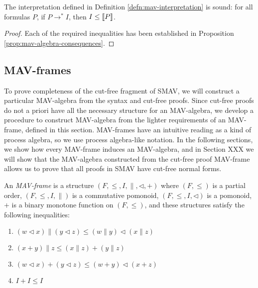 \begin{theorem}\label{thm:soundness}
  The interpretation defined in Definition
  \ref{defn:mav-interpretation} is sound: for all formulas $P$, if
  $P \longrightarrow^* I$, then $I \leq \llbracket P \rrbracket$.
\end{theorem}

\begin{proof}
  Each of the required inequalities has been established in
  Proposition \ref{prop:mav-algebra-consequences}.
\end{proof}

\subsection{MAV-frames}

To prove completeness of the cut-free fragment of SMAV, we will
construct a particular MAV-algebra from the syntax and cut-free
proofs. Since cut-free proofs do not a priori have all the necessary
structure for an MAV-algebra, we develop a procedure to construct
MAV-algebra from the lighter requirements of an MAV-frame, defined in
this section. MAV-frames have an intuitive reading as a kind of
process algebra, so we use process algebra-like notation. In the
following sections, we show how every MAV-frame induces an
MAV-algebra, and in Section XXX we will show that the MAV-algebra
constructed from the cut-free proof MAV-frame allows us to prove that
all proofs in SMAV have cut-free normal forms.

\begin{definition}
  An \emph{MAV-frame} is a structure
  $(F, \leq, I, \parallel, \lhd, +)$ where $(F, \leq)$ is a partial
  order, $(F, \leq, I, \parallel)$ is a commutative pomonoid,
  $(F, \leq, I, \lhd)$ is a pomonoid, $+$ is a binary monotone
  function on $(F, \leq)$, and these structures satisfy the following
  inequalities:
  \begin{enumerate}
    \item $(w \lhd x) \parallel (y \lhd z) \leq (w \parallel y) \lhd (x \parallel z)$
    \item $(x + y) \parallel z \leq (x \parallel z) + (y \parallel z)$
    \item $(w \lhd x) + (y \lhd z) \leq (w + y) \lhd (x + z)$
    \item $I + I \leq I$
  \end{enumerate}
\end{definition}

\begin{remark}
\end{remark}

